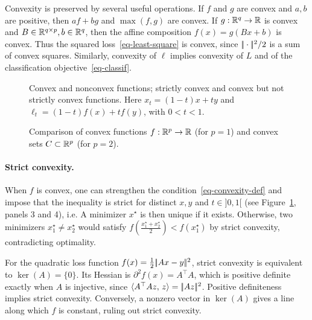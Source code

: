Convexity is preserved by several useful operations. If $f$ and $g$ are convex and $a, b$ are positive, then $a f + b g$ and $\max(f,g)$ are convex. If $g : \mathbb{R}^q \rightarrow \mathbb{R}$ is convex and $B \in \mathbb{R}^{q \times p}, b \in \mathbb{R}^q$, then the affine composition $f(x) = g(B x+b)$ is convex.
%
Thus the squared loss~\eqref{eq-least-square} is convex, since $|\!| \cdot |\!|^2/2$ is a sum of convex squares.
%
Similarly, convexity of $\ell$ implies convexity of $L$ and of the classification objective~\eqref{eq-classif}.

\begin{figure}[tbp]
\centering
{}\hfill
{}\hfill
{}\hfill
{}
\caption{Convex and nonconvex functions; strictly convex and convex but not strictly convex functions. Here $x_t=(1-t)x+ty$ and $\ell_t=(1-t)f(x)+tf(y)$, with $0<t<1$.}
\label{fig-cvx-vs-noncvx}
\label{fig-cvx-vs-noncvx-continued}
\end{figure}




\begin{figure}[tbp]
\centering
{}
\caption{Comparison of convex functions $f : \mathbb{R}^p \rightarrow \mathbb{R}$ (for $p=1$) and convex sets $C \subset \mathbb{R}^p$ (for $p=2$).}
\label{fig-cvx-set}
\end{figure}

\paragraph{Strict convexity.}

When $f$ is convex, one can strengthen the condition~\eqref{eq-convexity-def} and impose that the inequality is strict for distinct $x,y$ and $t\in]0,1[$ (see Figure~\ref{fig-cvx-vs-noncvx-continued}, panels 3 and 4), i.e.
\eql{\label{eq-strict-convexity-def}
	\foralls t \in ]0,1[, \quad
		f((1-t)x + t y) < (1-t)f(x) + t f(y).
}
A minimizer $x^\star$ is then unique if it exists. Otherwise, two minimizers $x_1^\star \neq x_2^\star$ would satisfy $f(\frac{x_1^\star+x_2^\star}{2}) < f(x_1^\star)$ by strict convexity, contradicting optimality.

\begin{exmp}
	For the quadratic loss function $f(x)=\frac{1}{2}|\!| Ax-y |\!|^2$, strict convexity is equivalent to $\ker(A)=\{0\}$.
	Its Hessian is $\partial^2 f(x)=A^\top A$, which is positive definite exactly when $A$ is injective, since $\langle A^\top A z,\,z\rangle=|\!| Az |\!|^2$. Positive definiteness implies strict convexity. Conversely, a nonzero vector in $\ker(A)$ gives a line along which $f$ is constant, ruling out strict convexity.
\end{exmp}

